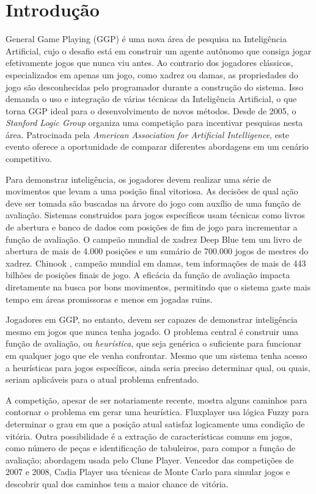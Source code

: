 \chapter{Introdução}
\label{intro}

General Game Playing (GGP) é uma nova área de pesquisa na Inteligência Artificial, cujo o desafio está em construir um agente autônomo que consiga jogar efetivamente jogos que nunca viu antes. Ao contrario dos jogadores clássicos, especializados em apenas um jogo, como xadrez ou damas, as propriedades do jogo são desconhecidas pelo programador durante a construção do sistema. Isso demanda o uso e integração de várias técnicas da Inteligência Artificial, o que torna GGP ideal para o desenvolvimento de novos métodos. Desde de 2005, o \textit{Stanford Logic Group} organiza uma competição para incentivar pesquisas nesta área. Patrocinada pela \textit{American Association for Artificial Intelligence}, este evento oferece a oportunidade de comparar diferentes abordagens em um cenário competitivo.  

Para demonstrar inteligência, os jogadores devem realizar uma série de movimentos que levam a uma posição final vitoriosa. As decisões de qual ação deve ser tomada são buscadas na árvore do jogo com auxílio de uma função de avaliação. Sistemas construidos para jogos específicos usam técnicas como livros de abertura e banco de dados com posições de fim de jogo para incrementar a função de avaliação. O campeão mundial de xadrez Deep Blue \cite{dblue} tem um livro de abertura de mais de 4.000 posições e um sumário de 700.000 jogos de mestres do xadrez. 
Chinook \cite{chinook}, campeão mundial em damas, tem informações de mais de 443 bilhões de posições finais de jogo. A eficácia da função de avaliação impacta diretamente na busca por bons movimentos, permitindo que o sistema gaste mais tempo em áreas promissoras e menos em jogadas ruins.

Jogadores em GGP, no entanto, devem ser capazes de demonstrar inteligência mesmo em jogos que nunca tenha jogado. O problema central é construir uma função de avaliação, ou \textit{heurística}, que seja genérica o suficiente para funcionar em qualquer jogo que ele venha confrontar. Mesmo que um sistema tenha acesso a heurísticas para jogos específicos, ainda seria preciso determinar qual, ou quais, seriam aplicáveis para o atual problema enfrentado.

A competição, apesar de ser notariamente recente, mostra alguns caminhos para contornar o problema em gerar uma heurística. Fluxplayer\cite{flux} usa lógica Fuzzy para determinar o grau em que a posição atual satisfaz logicamente uma condição de vitória. Outra possibilidade é a extração de características comuns em jogos, como número de peças e identificação de tabuleiros, para compor a função de avaliação; abordagem usada pelo Clune Player\cite{clune}. Vencedor das competições de 2007 e 2008, Cadia Player\cite{cadia} usa técnicas de Monte Carlo para simular jogos e descobrir qual dos caminhos tem a maior chance de vitória.

